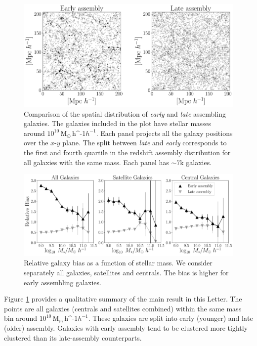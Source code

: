 \documentclass[fleqn,usenatbib]{mnras}
\newcommand{\Msunh}{\,{\rm M}$_{\odot}$\,\ifmmode h^{-1}\else $h^{-1}$\fi}
\begin{document}
 \begin{figure}
    \centering
    \includegraphics[width=1.8\columnwidth]{figuras/scatter_assembly.pdf}
    \caption{Comparison of the spatial distribution of \emph{early}
      and \emph{late} assembling galaxies. 
    The galaxies included in the plot have stellar masses around
    $10^{10}$\Msunh.  
    Each panel projects all the galaxy positions over the $x$-$y$
    plane.  
    The split between \emph{late} and \emph{early} corresponds to the
    first and fourth quartile in the redshift assembly distribution
    for all galaxies with the same mass. 
    Each panel has $\sim7$k galaxies. }
    \label{fig:comparison}
\end{figure}

\begin{figure}
    \centering
    \includegraphics[width=2.0\columnwidth]{figuras/bias_galaxies.pdf}
    \caption{Relative galaxy bias as a function of stellar mass.
    We consider separately all galaxies, satellites and centrals.
    The bias is higher for early assembling galaxies.}
    \label{fig:galaxy_bias}
\end{figure}


Figure \ref{fig:comparison} provides a qualitative summary of the main
result in this Letter.
The points are all galaxies (centrals and satellites combined) 
within the same mass bin around $10^{10}$\Msunh. 
These galaxies are split into early (younger) and late (older)
assembly. 
Galaxies with early assembly tend to be clustered more tightly
clustered than its late-assembly counterparts.
\end{document}
